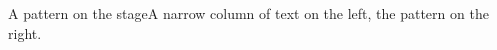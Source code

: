 \documentclass[aspectratio=169]{beamer}
\begin{document}
\begin{frame}{A pattern on the stage}A narrow column of text on the left, the pattern on the right.\end{frame}
\end{document}
